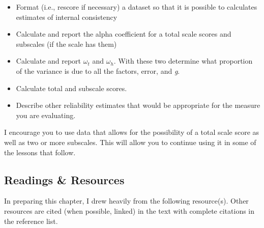 \documentclass[
  english,
]{book}
\providecommand{\tightlist}{%
  \setlength{\itemsep}{0pt}\setlength{\parskip}{0pt}}
\begin{document}
\begin{itemize}
\tightlist
\item
  Format (i.e., rescore if necessary) a dataset so that it is possible to calculates estimates of internal consistency
\item
  Calculate and report the alpha coefficient for a total scale scores and subscales (if the scale has them)
\item
  Calculate and report \(\omega_{t}\) and \(\omega_{h}\). With these two determine what proportion of the variance is due to all the factors, error, and \emph{g}.
\item
  Calculate total and subscale scores.
\item
  Describe other reliability estimates that would be appropriate for the measure you are evaluating.
\end{itemize}

I encourage you to use data that allows for the possibility of a total scale score as well as two or more subscales. This will allow you to continue using it in some of the lessons that follow.

\hypertarget{readings-resources-3}{%
\subsection{Readings \& Resources}\label{readings-resources-3}}

In preparing this chapter, I drew heavily from the following resource(s). Other resources are cited (when possible, linked) in the text with complete citations in the reference list.
\end{document}
